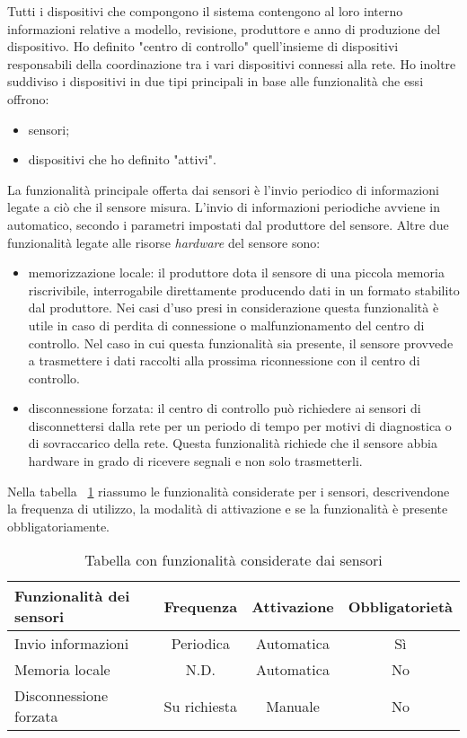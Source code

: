 Tutti i dispositivi che compongono il sistema contengono al loro interno informazioni relative a modello, revisione, produttore e anno di produzione del dispositivo.
Ho definito "centro di controllo" quell'insieme di dispositivi responsabili della coordinazione tra i vari dispositivi connessi alla rete.
Ho inoltre suddiviso i dispositivi in due tipi principali in base alle funzionalità che essi offrono:
\begin{itemize}
	\item sensori;
	\item dispositivi che ho definito "attivi".
\end{itemize}
La funzionalità principale offerta dai sensori è l'invio periodico di informazioni legate a ciò che il sensore misura.
L'invio di informazioni periodiche avviene in automatico, secondo i parametri impostati dal produttore del sensore.
Altre due funzionalità legate alle risorse \emph{hardware} del sensore sono:
\begin{itemize}
	\item memorizzazione locale: il produttore dota il sensore di una piccola memoria riscrivibile, interrogabile direttamente producendo dati in un formato stabilito dal produttore. Nei casi d'uso presi in considerazione questa funzionalità è utile in caso di perdita di connessione o malfunzionamento del centro di controllo. Nel caso in cui questa funzionalità sia presente, il sensore provvede a trasmettere i dati raccolti alla prossima riconnessione con il centro di controllo.
	\item disconnessione forzata: il centro di controllo può richiedere ai sensori di disconnettersi dalla rete per un periodo di tempo per motivi di diagnostica o di sovraccarico della rete. Questa funzionalità richiede che il sensore abbia hardware in grado di ricevere segnali e non solo trasmetterli.
\end{itemize}

Nella tabella ~\ref{tab:funz-sensori} riassumo le funzionalità considerate per i sensori, descrivendone la frequenza di utilizzo, la modalità di attivazione e se la funzionalità è presente obbligatoriamente.

\begin{table}[H]
\caption{Tabella con funzionalità considerate dai sensori}
\label{tab:funz-sensori}
\begin{tabularx}{\linewidth}{|X|c|c|c|}
\hline
\textbf{Funzionalità dei sensori} & \textbf{Frequenza} & \textbf{Attivazione} & \textbf{Obbligatorietà} \\
\hline
Invio informazioni & Periodica & Automatica & Sì \\
\hline
Memoria locale & N.D. & Automatica & No \\
\hline
Disconnessione forzata & Su richiesta & Manuale & No \\
\hline
\end{tabularx}
\end{table}

